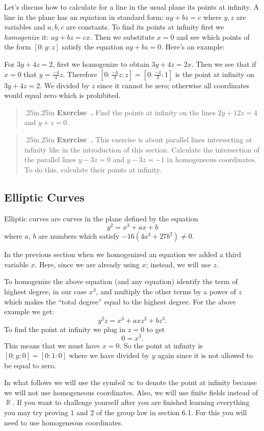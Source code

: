 \documentclass[12 pt]{article}
\DeclareMathOperator{\R}{\mathbb{R}}
\newcounter{exercise}[section]
\newenvironment{exercise}{\refstepcounter{exercise}\par\bigskip \begin{quotation}{}{\leftmargin .25in\rightmargin .25in}
	\noindent \textbf{Exercise~\thesection.\theexercise }  \rmfamily}{\end{quotation}\par\bigskip}
\begin{document}
Let's discuss how to calculate for a line in the usual plane its points at infinity. A line in the plane has an equation in standard form: $ay+bz=c$ where $y,z$ are variables and $a,b,c$ are constants. To find its points at infinity first we \emph{homogenize} it: $ay+bz=cx$. Then we substitute $x=0$ and see which points of the form $[0:y:z]$ satisfy the equation $ay+bz=0$. Here's an example:

For $3y+4z=2$, first we homogenize to obtain $3y+4z=2x$. Then we see that if $x=0$ that $y=\frac{-4}{3}z$. Therefore $[0:\frac{-4}{3}z:z]=[0:\frac{-4}{3}:1]$ is the point at infinity on $3y+4z=2$. We divided by $z$ since it cannot be zero; otherwise all coordinates would equal zero which is prohibited.

\begin{exercise}
Find the points at infinity on the lines $2y+12z=4$ and $y+z=0$.
\end{exercise}

\begin{exercise}
This exercise is about parallel lines intersecting at infinity like in the introduction of this section. Calculate the intersection of the parallel lines $y-3z=0$ and $y-3z=-1$ in homogeneous coordinates. To do this, calculate their points at infinity.
\end{exercise}

\subsection{Elliptic Curves}
Elliptic curves are curves in the plane defined by the equation 
\[
y^2=x^3+ax+b
\]
where $a$, $b$ are numbers which satisfy $-16(4a^3+27b^2)\not=0$. 

In the previous section when we homogenized an equation we added a third variable $x$. Here, since we are already using $x$; instead, we will use $z$.

To homogenize the above equation (and any equation) identify the term of highest degree, in our case $x^3$, and multiply the other terms by a power of $z$ which makes the ``total degree'' equal to the highest degree. For the above example we get:
\[
y^2z=x^3+axz^2+bz^3.
\]
To find the point at infinity we plug in $z=0$ to get
\[
0=x^3.
\]
This means that we must have $x=0$. So the point at infinity is $[0:y:0]=[0:1:0]$ where we have divided by $y$ again since it is not allowed to be equal to zero.

In what follows we will use the symbol $\infty$ to denote the point at infinity because we will not use homogeneous coordinates. Also, we will use finite fields instead of $\R$. If you want to challenge yourself after you are finished learning everything you may try proving $1$ and $2$ of the group law in section 6.1. For this you will need to use homogeneous coordinates.
\end{document}
